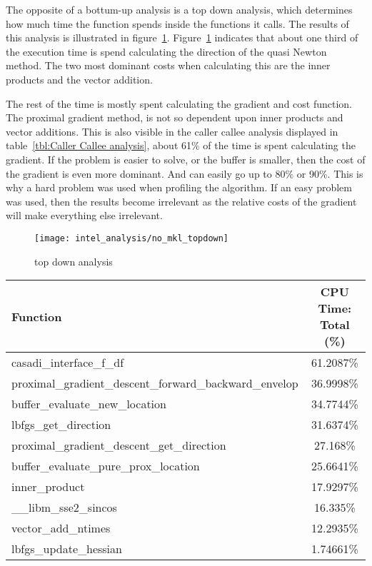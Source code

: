 The opposite of a bottum-up  analysis is a top down analysis, which determines how  much time the  function spends inside the functions it calls. The results of this analysis is illustrated in figure~\ref{fig:no mkl top down}. Figure~\ref{fig:no mkl top down} indicates that about one third of the execution time is spend calculating the direction of the quasi Newton method. The two most dominant costs when calculating this are the inner products and the vector addition.

The rest of the time is mostly spent calculating the gradient and cost function. The proximal gradient method, is not so dependent upon inner products and vector additions. This is also visible in the caller callee analysis displayed in table~\ref{tbl:Caller Callee analysis}, about 61\% of the time is spent calculating the gradient. If the problem is easier to solve, or the buffer is smaller, then the cost of the gradient is even more dominant. And can easily go up to 80\% or 90\%. This is why a hard problem was used when profiling the algorithm. If an easy problem was used, then the results become irrelevant as the relative costs of the gradient will make everything else irrelevant.

\begin{figure}[H]
	\centering
	\texttt{[image: intel\_analysis/no\_mkl\_topdown]}
	\caption{top down analysis}
	\label{fig:no mkl top down}
\end{figure}

\begin{center}
	\begin{tabular}{| l | c |}
		\hline
		Function&CPU Time: Total (\%) \\
		\hline
		casadi\_interface\_f\_df&61.2087\% \\
		proximal\_gradient\_descent\_forward\_backward\_envelop&36.9998\% \\
		buffer\_evaluate\_new\_location&34.7744\% \\
		lbfgs\_get\_direction&31.6374\% \\
		proximal\_gradient\_descent\_get\_direction&27.168\% \\
		buffer\_evaluate\_pure\_prox\_location&25.6641\% \\
		inner\_product&17.9297\% \\
		\_\_libm\_sse2\_sincos&16.335\% \\
		vector\_add\_ntimes&12.2935\% \\
		lbfgs\_update\_hessian&1.74661\% \\
		\hline
	\end{tabular}
	\label{tbl:Caller Callee analysis}
\end{center}

